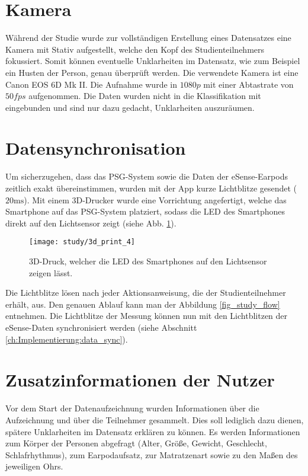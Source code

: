 \section{Kamera}
\label{ch:sa:camera}
Während der Studie wurde zur vollständigen Erstellung eines Datensatzes eine Kamera mit Stativ aufgestellt, welche den Kopf des Studienteilnehmers fokussiert. 
Somit können eventuelle Unklarheiten im Datensatz, wie zum Beispiel ein Husten der Person, genau überprüft werden. 
Die verwendete Kamera ist eine \glqq Canon EOS 6D Mk II\grqq.
Die Aufnahme wurde in $1080p$ mit einer Abtastrate von $50fps$ aufgenommen.
Die Daten wurden nicht in die Klassifikation mit eingebunden und sind nur dazu gedacht, Unklarheiten auszuräumen.

\section{Datensynchronisation}
\label{ch:sa:data_synchronisation}
Um sicherzugehen, dass das PSG-System sowie die Daten der eSense-Earpods zeitlich exakt übereinstimmen, wurden mit der App kurze Lichtblitze gesendet ($20 \si{\ms}$).
Mit einem 3D-Drucker wurde eine Vorrichtung angefertigt, welche das Smartphone auf das PSG-System platziert, sodass die LED des Smartphones direkt auf den Lichtsensor zeigt (siehe Abb. \ref{study:3d_print}).

\begin{figure}[ht]
    \centering
    \texttt{[image: study/3d\_print\_4]}
    \caption{3D-Druck, welcher die LED des Smartphones auf den Lichtsensor zeigen lässt.}
    \label{study:3d_print}
  \end{figure}

Die Lichtblitze lösen nach jeder Aktionsanweisung, die der Studienteilnehmer erhält, aus. 
Den genauen Ablauf kann man der Abbildung \ref{fig_study_flow} entnehmen.
Die Lichtblitze der Messung können nun mit den Lichtblitzen der eSense-Daten synchronisiert werden (siehe Abschnitt \ref{ch:Implementierung:data_sync}).

\section{Zusatzinformationen der Nutzer}
\label{ch:sa:additionalUserStudiesInformation}
Vor dem Start der Datenaufzeichnung wurden Informationen über die Aufzeichnung und über die Teilnehmer gesammelt. 
Dies soll lediglich dazu dienen, spätere Unklarheiten im Datensatz erklären zu können.
Es werden Informationen zum Körper der Personen abgefragt (Alter, Größe, Gewicht, Geschlecht, Schlafrhythmus), zum Earpodaufsatz, zur Matratzenart sowie zu den Maßen des jeweiligen Ohrs.

